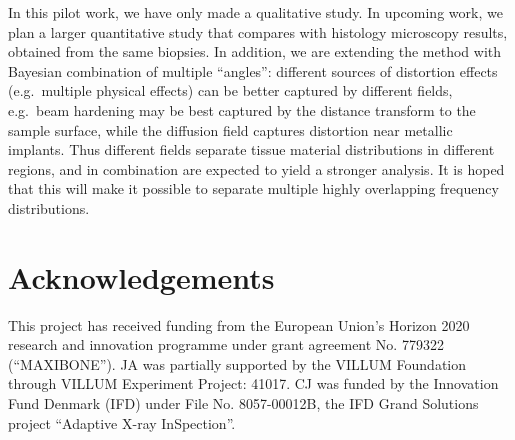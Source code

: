 \documentclass[pdflatex,sn-mathphys]{sn-jnl}%
\theoremstyle{thmstyleone}%
\theoremstyle{thmstyletwo}%
\theoremstyle{thmstylethree}%
\begin{document}
In this pilot work, we have only made a qualitative study. In upcoming
work, we plan a larger quantitative study that compares with histology
microscopy results, obtained from the same biopsies.  In addition, we
are extending the method with Bayesian combination of multiple
``angles'': different sources of distortion effects (e.g.~multiple
physical effects) can be better captured by different fields,
e.g.~beam hardening may be best captured by the distance transform to
the sample surface, while the diffusion field captures distortion near
metallic implants. Thus different fields separate tissue material
distributions in different regions, and in combination are expected to
yield a stronger analysis. It is hoped that this will make it possible
to separate multiple highly overlapping frequency distributions.


\section{Acknowledgements}

This project has received funding from the European Union’s Horizon 2020 research and innovation programme under grant agreement No. 779322 (``MAXIBONE'').
JA was partially supported by the VILLUM Foundation through VILLUM Experiment Project: 41017.
CJ was funded by the Innovation Fund Denmark (IFD) under File No. 8057-00012B, the IFD Grand Solutions project ``Adaptive X-ray InSpection''.


\end{document}
